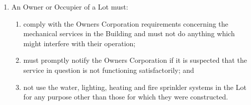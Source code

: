 \documentclass{article}
\begin{document}
\begin{enumerate}[label=\arabic*.]
\begin{enumerate}[label=\arabic{enumi}.\arabic*.]
\begin{enumerate}[label=\arabic{enumi}.\arabic*.]
\begin{enumerate}[label=(\arabic*)]
\begin{enumerate}[label=(\alph*)]

\item  obtain the Owners Corporation prior written consent before an Occupier installs any equipment on the Owner’s Lot;

\item  obtain the Owners Corporation prior written consent before any heavy equipment is brought on to the Owner’s Lot;

\item  ensure all equipment installed on the Owner’s Lot must be reasonably necessary for carrying on the Occupier’s business in the Lot;

\item  not have any equipment that may cause any structural or other damage to the floors or other parts of the Owner’s Lot or the Common Property or nuisance (including noise or vibration) to any other Lot Owner or Occupier;

\item  give the Owners Corporation at least 5 Business Days’ prior written notice before the Lot Owner brings equipment onto the Lot or the Common Property;

\item  obey the Owners Corporation’s reasonable requirements in relation to the routing, installation and location of the equipment.

\end{enumerate}

\item  An Owner or Occupier of a Lot must:

\begin{enumerate}[label=(\alph*)]

\item  comply with the Owners Corporation requirements concerning the mechanical services in the Building and must not do anything which might interfere with their operation;

\item  must promptly notify the Owners Corporation if it is suspected that the service in question is not functioning satisfactorily; and

\item  not use the water, lighting, heating and fire sprinkler systems in the Lot for any purpose other than those for which they were constructed.

\end{enumerate}


\end{enumerate}
\end{enumerate}
\end{enumerate}
\end{enumerate}
\end{document}
